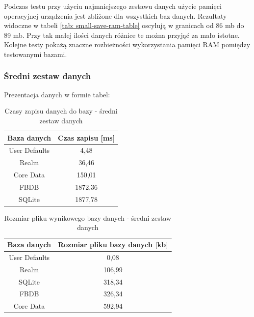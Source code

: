 Podczas testu przy użyciu najmniejszego zestawu danych użycie pamięci operacyjnej urządzenia jest zbliżone dla wszystkich baz danych. Rezultaty widoczne w tabeli \ref{tab: small-save-ram-table} oscylują w granicach od 86 mb do 89 mb. Przy tak małej ilości danych różnice te można przyjąć za mało istotne. Kolejne testy pokażą znaczne rozbieżności wykorzystania pamięci RAM pomiędzy testowanymi bazami.

\newpage

\subsubsection{Średni zestaw danych}

Prezentacja danych w formie tabel: 

\begin{table}[h]
\centering
\caption{Czasy zapisu danych do bazy - średni zestaw danych}
\label{tab: medium-save-time-table}
\begin{tabular}{|c|c|}
\hline
Baza danych   & Czas zapisu [ms] \\ \hline
User Defaults & 4,48             \\ \hline
Realm         & 36,46            \\ \hline
Core Data     & 150,01           \\ \hline
FBDB          & 1872,36          \\ \hline
SQLite        & 1877,78          \\ \hline
\end{tabular}
\end{table}

\begin{table}[h]
\centering
\caption{Rozmiar pliku wynikowego bazy danych - średni zestaw danych}
\label{tab: medium-save-file-size-table}
\begin{tabular}{|c|c|}
\hline
Baza danych   & Rozmiar pliku bazy danych [kb] \\ \hline
User Defaults & 0,08                           \\ \hline
Realm         & 106,99                         \\ \hline
SQLite        & 318,34                         \\ \hline
FBDB          & 326,34                         \\ \hline
Core Data     & 592,94                         \\ \hline
\end{tabular}
\end{table}

